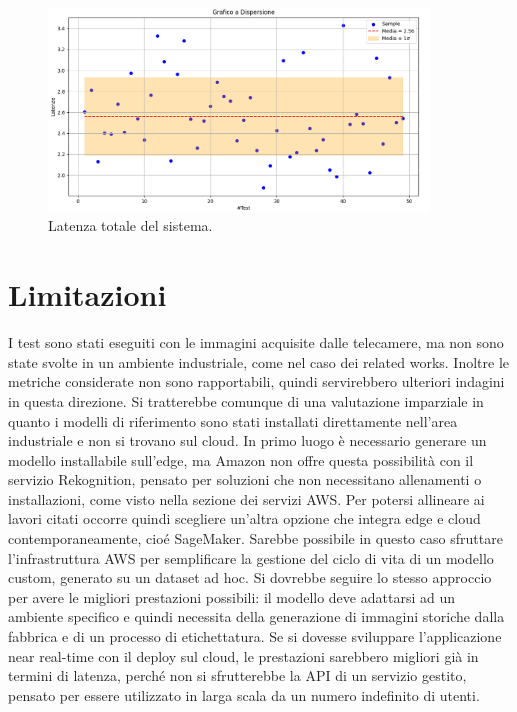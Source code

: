 \begin{figure}[htbp]
    \centering
    \includegraphics[width=0.9\textwidth]{figures/system-latency.png}
    \caption{Latenza totale del sistema.} 
    \label{fig:system-latency}
\end{figure}

\section{Limitazioni}











I test sono stati eseguiti con le immagini acquisite dalle telecamere, ma non sono state svolte in un ambiente industriale, come nel caso dei related works. Inoltre le metriche considerate non sono rapportabili, quindi servirebbero ulteriori indagini in questa direzione. Si tratterebbe comunque di una valutazione imparziale in quanto i modelli di riferimento sono stati installati direttamente nell'area industriale e non si trovano sul cloud. In primo luogo è necessario generare un modello installabile sull'edge, ma Amazon non offre questa possibilità con il servizio Rekognition, pensato per soluzioni che non necessitano allenamenti o installazioni, come visto nella sezione dei servizi AWS. Per potersi allineare ai lavori citati occorre quindi scegliere un'altra opzione che integra edge e cloud contemporaneamente, cioé SageMaker. Sarebbe possibile in questo caso sfruttare l'infrastruttura AWS per semplificare la gestione del ciclo di vita di un modello custom, generato su un dataset ad hoc. Si dovrebbe seguire lo stesso approccio per avere le migliori prestazioni possibili: il modello deve adattarsi ad un ambiente specifico e quindi necessita della generazione di immagini storiche dalla fabbrica e di un processo di etichettatura. Se si dovesse sviluppare l'applicazione near real-time con il deploy sul cloud, le prestazioni sarebbero migliori già in termini di latenza, perché non si sfrutterebbe la API di un servizio gestito, pensato per essere utilizzato in larga scala da un numero indefinito di utenti.     

